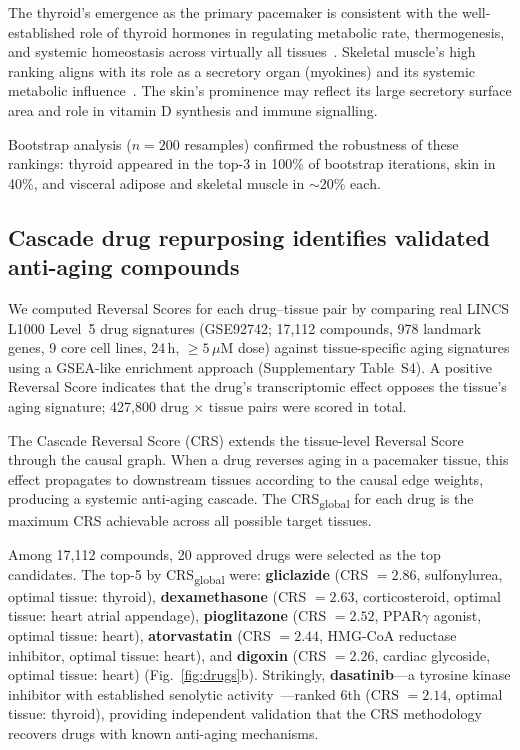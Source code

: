 \documentclass[11pt,a4paper]{article}
\begin{document}
The thyroid's emergence as the primary pacemaker is consistent with the well-established role of thyroid hormones in regulating metabolic rate, thermogenesis, and systemic homeostasis across virtually all tissues~\cite{ref11}. Skeletal muscle's high ranking aligns with its role as a secretory organ (myokines) and its systemic metabolic influence~\cite{ref9}. The skin's prominence may reflect its large secretory surface area and role in vitamin D synthesis and immune signalling.

Bootstrap analysis ($n = 200$ resamples) confirmed the robustness of these rankings: thyroid appeared in the top-3 in 100\% of bootstrap iterations, skin in 40\%, and visceral adipose and skeletal muscle in ${\sim}20$\% each.

\subsection*{Cascade drug repurposing identifies validated anti-aging compounds}

We computed Reversal Scores for each drug--tissue pair by comparing real LINCS L1000 Level~5 drug signatures (GSE92742; 17,112 compounds, 978 landmark genes, 9 core cell lines, 24\,h, $\geq 5$\,$\mu$M dose) against tissue-specific aging signatures using a GSEA-like enrichment approach (Supplementary Table~S4). A positive Reversal Score indicates that the drug's transcriptomic effect opposes the tissue's aging signature; 427,800 drug $\times$ tissue pairs were scored in total.

The Cascade Reversal Score (CRS) extends the tissue-level Reversal Score through the causal graph. When a drug reverses aging in a pacemaker tissue, this effect propagates to downstream tissues according to the causal edge weights, producing a systemic anti-aging cascade. The CRS\textsubscript{global} for each drug is the maximum CRS achievable across all possible target tissues.

Among 17,112 compounds, 20 approved drugs were selected as the top candidates. The top-5 by CRS\textsubscript{global} were: \textbf{gliclazide} (CRS $= 2.86$, sulfonylurea, optimal tissue: thyroid), \textbf{dexamethasone} (CRS $= 2.63$, corticosteroid, optimal tissue: heart atrial appendage), \textbf{pioglitazone} (CRS $= 2.52$, PPAR$\gamma$ agonist, optimal tissue: heart), \textbf{atorvastatin} (CRS $= 2.44$, HMG-CoA reductase inhibitor, optimal tissue: heart), and \textbf{digoxin} (CRS $= 2.26$, cardiac glycoside, optimal tissue: heart) (Fig.~\ref{fig:drugs}b). Strikingly, \textbf{dasatinib}---a tyrosine kinase inhibitor with established senolytic activity~\cite{ref18,ref51}---ranked 6th (CRS $= 2.14$, optimal tissue: thyroid), providing independent validation that the CRS methodology recovers drugs with known anti-aging mechanisms.
\end{document}
